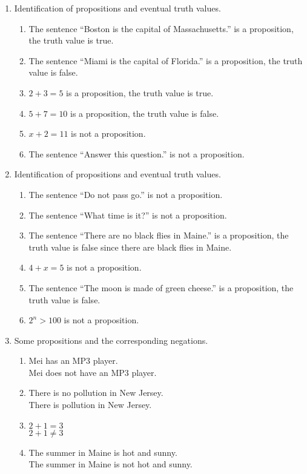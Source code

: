 \documentclass{article}
\begin{document}
\begin{enumerate}[label=\textbf{\arabic*}]

	\item Identification of propositions and eventual truth values.  
  \begin{enumerate}[label=\textbf{\alph*)}]
    \item The sentence ``Boston is the capital of Massachusetts.'' is a proposition, the truth value is true.
    \item The sentence ``Miami is the capital of Florida.'' is a proposition, the truth value is false.
    \item $ 2 + 3 = 5 $ is a proposition, the truth value is true.  
    \item $ 5 + 7 = 10 $ is a proposition, the truth value is false.
    \item $ x + 2 = 11 $ is not a proposition.
    \item The sentence ``Answer this question.'' is not a proposition. 
  \end{enumerate}

  \item Identification of propositions and eventual truth values.
  \begin{enumerate}[label=\textbf{\alph*)}]
    \item The sentence ``Do not pass go.'' is not a proposition.
    \item The sentence ``What time is it?'' is not a proposition.
    \item The sentence ``There are no black flies in Maine.'' is a proposition, the truth value is false since there are black flies in Maine.
    \item $ 4 + x = 5 $ is not a proposition.
    \item The sentence ``The moon is made of green cheese.'' is a proposition, the truth value is false.
    \item  $ 2^n > 100 $ is not a proposition.
  \end{enumerate}
  
  \item Some propositions and the corresponding negations.
  \begin{enumerate}[label = \textbf{\alph*)}]
  \item 
  Mei has an MP3 player.\\
  Mei does not have an MP3 player.
  \item
  There is no pollution in New Jersey.\\
  There is pollution in New Jersey.
  \item
  $2 + 1 = 3$\\
  $2 + 1 \neq 3$
  \item
  The summer in Maine is hot and sunny.\\
  The summer in Maine is not hot and sunny.
  \end{enumerate}
  
\end{enumerate}
  
\end{document}
